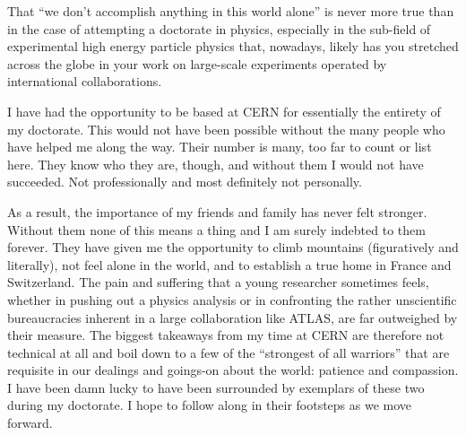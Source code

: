 That ``we don't accomplish anything in this world alone'' is never more true than in the
case of attempting a doctorate in physics, especially in the sub-field of experimental
high energy particle physics that, nowadays, likely has you stretched across the globe
in your work on large-scale experiments operated by international collaborations.

I have had the opportunity to be based at CERN for essentially the entirety of my doctorate.
This would not have been possible without the many people who have helped me along the way.
Their number is many, too far to count or list here.
They know who they are, though, and without them I would not have succeeded.
Not professionally and most definitely not personally.

As a result, the importance of my friends and family has never felt stronger.
Without them none of this means a thing and I am surely indebted to them forever.
They have given me the opportunity to climb mountains (figuratively and literally), not feel alone in the world,
and to establish a true home in France and Switzerland.
The pain and suffering that a young researcher sometimes feels, whether in pushing out a physics analysis or in confronting the
rather unscientific bureaucracies inherent in a large collaboration like ATLAS, are far outweighed by their measure.
The biggest takeaways from my time at CERN are therefore not technical at all and boil down to
a few of the ``strongest of all warriors'' that are requisite in our dealings and goings-on about
the world: patience and compassion.
I have been damn lucky to have been surrounded by exemplars of these two during my doctorate.
I hope to follow along in their footsteps as we move forward.
